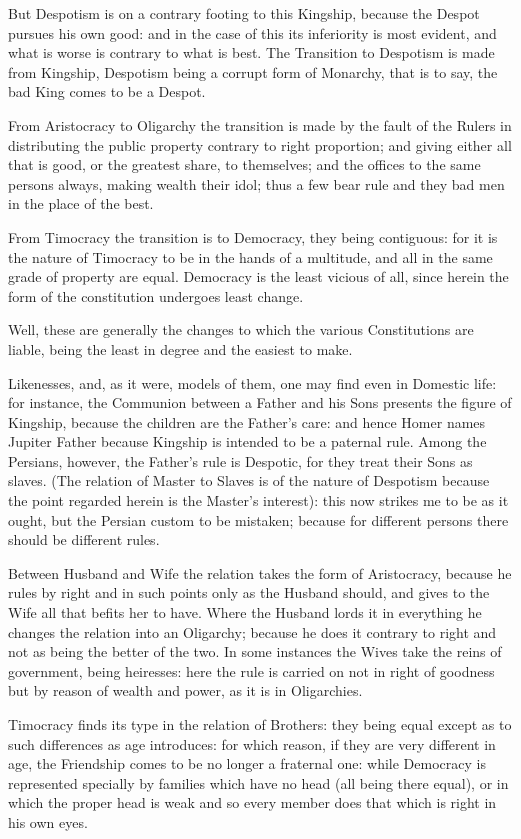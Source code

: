 But Despotism is on a contrary footing to this Kingship, because the Despot
pursues his own good: and in the case of this its inferiority is most evident,
and what is worse is contrary to what is best. The Transition to Despotism is
made from Kingship, Despotism being a corrupt form of Monarchy, that is to say,
the bad King comes to be a Despot.

From Aristocracy to Oligarchy the transition is made by the fault of the Rulers
in distributing the public property contrary to right proportion; and giving
either all that is good, or the greatest share, to themselves; and the offices
to the same persons always, making wealth their idol; thus a few bear rule and
they bad men in the place of the best.

From Timocracy the transition is to Democracy, they being contiguous: for it is
the nature of Timocracy to be in the hands of a multitude, and all in the same
grade of property are equal. Democracy is the least vicious of all, since
herein the form of the constitution undergoes least change.

Well, these are generally the changes to which the various Constitutions are
liable, being the least in degree and the easiest to make.

Likenesses, and, as it were, models of them, one may find even in Domestic
life: for instance, the Communion between a Father and his Sons presents the
figure of Kingship, because the children are the Father’s care: and hence
Homer names Jupiter Father because Kingship is intended to be a paternal rule.
Among the Persians, however, the Father’s rule is Despotic, for they
treat their Sons as slaves. (The relation of Master to Slaves is of the nature
of Despotism because the point regarded herein is the Master’s interest):
this now strikes me to be as it ought, but the Persian custom to be mistaken;
because for different persons there should be different rules.

Between Husband and Wife the relation takes the form of Aristocracy, because he
rules by right and in such points only as the Husband should, and gives to the
Wife all that befits her to have. Where the Husband lords it in everything he
changes the relation into an Oligarchy; because he does it contrary to right
and not as being the better of the two. In some instances the Wives take the
reins of government, being heiresses: here the rule is carried on not in right
of goodness but by reason of wealth and power, as it is in Oligarchies.

Timocracy finds its type in the relation of Brothers: they being equal except
as to such differences as age introduces: for which reason, if they are very
different in age, the Friendship comes to be no longer a fraternal one: while
Democracy is represented specially by families which have no head (all being
there equal), or in which the proper head is weak and so every member does that
which is right in his own eyes.

